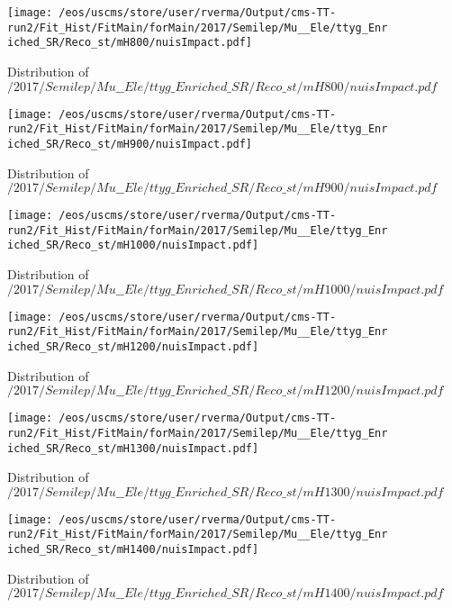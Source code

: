 \begin{figure}
\centering
\texttt{[image: /eos/uscms/store/user/rverma/Output/cms-TT-run2/Fit\_Hist/FitMain/forMain/2017/Semilep/Mu\_\_Ele/ttyg\_Enriched\_SR/Reco\_st/mH800/nuisImpact.pdf]}
\caption{Distribution of $/2017/Semilep/Mu\_\_Ele/ttyg\_Enriched\_SR/Reco\_st/mH800/nuisImpact.pdf$}
\end{figure}

\begin{figure}
\centering
\texttt{[image: /eos/uscms/store/user/rverma/Output/cms-TT-run2/Fit\_Hist/FitMain/forMain/2017/Semilep/Mu\_\_Ele/ttyg\_Enriched\_SR/Reco\_st/mH900/nuisImpact.pdf]}
\caption{Distribution of $/2017/Semilep/Mu\_\_Ele/ttyg\_Enriched\_SR/Reco\_st/mH900/nuisImpact.pdf$}
\end{figure}

\begin{figure}
\centering
\texttt{[image: /eos/uscms/store/user/rverma/Output/cms-TT-run2/Fit\_Hist/FitMain/forMain/2017/Semilep/Mu\_\_Ele/ttyg\_Enriched\_SR/Reco\_st/mH1000/nuisImpact.pdf]}
\caption{Distribution of $/2017/Semilep/Mu\_\_Ele/ttyg\_Enriched\_SR/Reco\_st/mH1000/nuisImpact.pdf$}
\end{figure}

\begin{figure}
\centering
\texttt{[image: /eos/uscms/store/user/rverma/Output/cms-TT-run2/Fit\_Hist/FitMain/forMain/2017/Semilep/Mu\_\_Ele/ttyg\_Enriched\_SR/Reco\_st/mH1200/nuisImpact.pdf]}
\caption{Distribution of $/2017/Semilep/Mu\_\_Ele/ttyg\_Enriched\_SR/Reco\_st/mH1200/nuisImpact.pdf$}
\end{figure}

\begin{figure}
\centering
\texttt{[image: /eos/uscms/store/user/rverma/Output/cms-TT-run2/Fit\_Hist/FitMain/forMain/2017/Semilep/Mu\_\_Ele/ttyg\_Enriched\_SR/Reco\_st/mH1300/nuisImpact.pdf]}
\caption{Distribution of $/2017/Semilep/Mu\_\_Ele/ttyg\_Enriched\_SR/Reco\_st/mH1300/nuisImpact.pdf$}
\end{figure}

\begin{figure}
\centering
\texttt{[image: /eos/uscms/store/user/rverma/Output/cms-TT-run2/Fit\_Hist/FitMain/forMain/2017/Semilep/Mu\_\_Ele/ttyg\_Enriched\_SR/Reco\_st/mH1400/nuisImpact.pdf]}
\caption{Distribution of $/2017/Semilep/Mu\_\_Ele/ttyg\_Enriched\_SR/Reco\_st/mH1400/nuisImpact.pdf$}
\end{figure}

